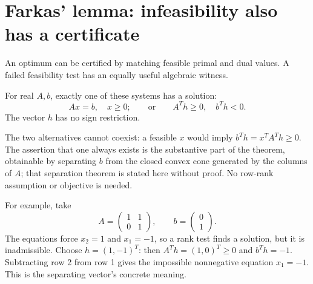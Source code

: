 \documentclass[11pt,a4paper]{article}
\begin{document}
\section{Farkas' lemma: infeasibility also has a certificate}\label{sec:farkas}
An optimum can be certified by matching feasible primal and dual values.
A failed feasibility test has an equally useful algebraic witness.
\begin{theorem}
  For real $A,b$, exactly one of these systems has a solution:
  \[
    Ax=b,\quad x\geq0;
    \qquad\text{or}\qquad
    A^Th\geq0,\quad b^Th<0.
  \]
  The vector $h$ has no sign restriction.
\end{theorem}
The two alternatives cannot coexist: a feasible $x$ would imply
$b^Th=x^TA^Th\geq0$. The assertion that one always exists is the
substantive part of the theorem, obtainable by separating $b$ from the
closed convex cone generated by the columns of $A$; that separation theorem
is stated here without proof. No row-rank assumption or objective is needed.

For example, take
\[
  A=\begin{pmatrix}1&1\\0&1\end{pmatrix},\qquad b=\begin{pmatrix}0\\1\end{pmatrix}.
\]
The equations force $x_2=1$ and $x_1=-1$, so a rank test finds a solution,
but it is inadmissible. Choose $h=(1,-1)^T$: then
$A^Th=(1,0)^T\geq0$ and $b^Th=-1$.
Subtracting row 2 from row 1 gives the impossible nonnegative equation
$x_1=-1$. This is the separating vector's concrete meaning.
\end{document}
